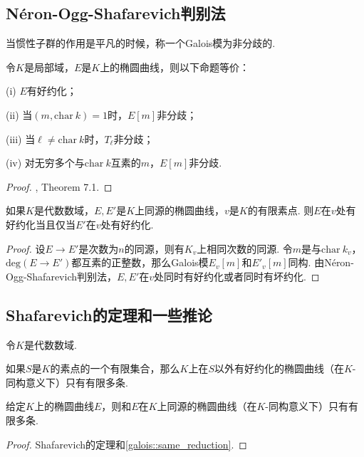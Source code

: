 \subsection{Néron-Ogg-Shafarevich判别法}

当惯性子群的作用是平凡的时候，称一个Galois模为非分歧的.

\begin{cthm}
    令$K$是局部域，$E$是$K$上的椭圆曲线，则以下命题等价：

    (i) $E$有好约化；

    (ii) 当$(m, \mathrm{char}\ k)=1$时，$E[m]$非分歧；

    (iii) 当$\ell\neq \mathrm{char}\ k$时，$T_{\ell}$非分歧；

    (iv) 对无穷多个与$\mathrm{char}\ k$互素的$m$，$E[m]$非分歧.
\end{cthm}

\begin{proof}
    \cite{silverman2009arithmetic}, Theorem 7.1.
\end{proof}

\begin{ccor}
    如果$K$是代数数域，$E, E'$是$K$上同源的椭圆曲线，$v$是$K$的有限素点. 则$E$在$v$处有好约化当且仅当$E'$在$v$处有好约化. \label{galois::same_reduction}
\end{ccor}

\begin{proof}
    设$E\to E'$是次数为$n$的同源，则有$K_v$上相同次数的同源. 令$m$是与$\mathrm{char}\ k_v$，$\mathrm{deg}(E\to E')$都互素的正整数，那么Galois模$E_v[m]$和$E'_v[m]$同构. 由Néron-Ogg-Shafarevich判别法，$E, E'$在$v$处同时有好约化或者同时有坏约化.
\end{proof}


\subsection{Shafarevich的定理和一些推论}

令$K$是代数数域.

\begin{cthm}[Shafarevich]
    如果$S$是$K$的素点的一个有限集合，那么$K$上在$S$以外有好约化的椭圆曲线（在$K$-同构意义下）只有有限多条.
\end{cthm}

\begin{ccor}
    给定$K$上的椭圆曲线$E$，则和$E$在$K$上同源的椭圆曲线（在$K$-同构意义下）只有有限多条.\label{galois::isogeny_finite_curves}
\end{ccor}

\begin{proof}
    Shafarevich的定理和\ref{galois::same_reduction}.
\end{proof}
